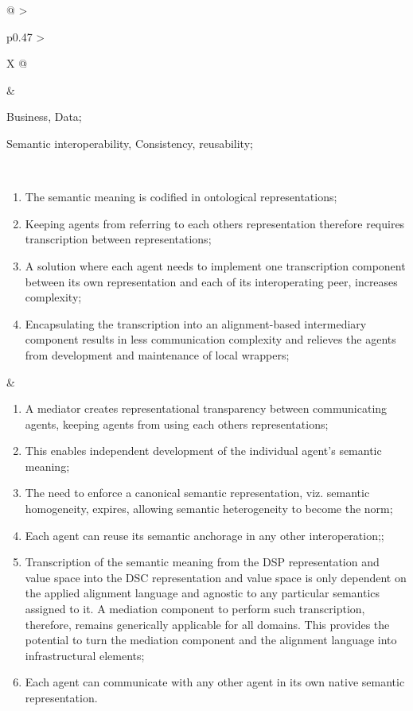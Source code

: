 \begin{xltabular}[l]{\linewidth}{@{} >{\small\raggedright\arraybackslash}p{0.47\linewidth} >{\small\raggedright\arraybackslash}X @{}}
&
\begin{description}[labelwidth=3.7cm,leftmargin=3.7cm+1ex,nosep,topsep=2ex,labelsep=1ex,font=\bfseries]
\item[Type of information:] Business, Data;
\item[Quality attributes:] Semantic interoperability, Consistency, reusability;
\end{description} \\
\begin{enumerate}[left=6pt, nosep]
  \item The semantic meaning is codified in ontological representations;
  \item Keeping agents from referring to each others representation therefore requires transcription between representations;
  \item A solution where each agent needs to implement one transcription component between its own representation and each of its interoperating peer, increases complexity;
  \item Encapsulating the transcription into an alignment-based intermediary component results in less communication complexity and relieves the agents from development and maintenance of local wrappers;
\end{enumerate}
&
\begin{enumerate}[left=10pt, nosep]
  \item A mediator creates representational transparency between communicating agents, keeping agents from using each others representations;
  \item This enables independent development of the individual agent’s semantic meaning;
  \item The need to enforce a canonical semantic representation, viz. semantic homogeneity, expires, allowing semantic heterogeneity to become the norm;
  \item Each agent can reuse its semantic anchorage in any other interoperation;;
  \item Transcription of the semantic meaning from the DSP representation and value space into the DSC representation and value space is only dependent on the applied alignment language and agnostic to any particular semantics assigned to it. A mediation component to perform such transcription, therefore, remains generically applicable for all domains. This provides the potential to turn the mediation component and the alignment language into infrastructural elements;
  \item Each agent can communicate with any other agent in its own native semantic representation.
\end{enumerate}\\
%
\bottomrule
\end{xltabular}
